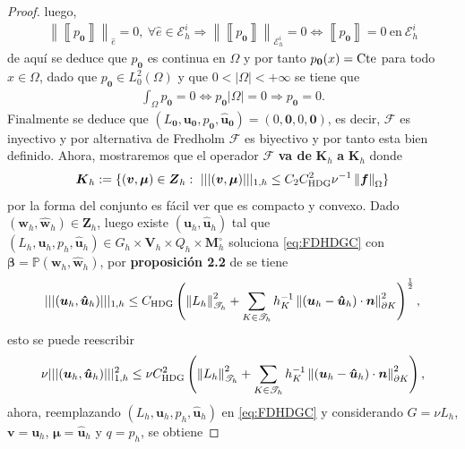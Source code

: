 \documentclass[10pt,a4paper]{report}
\newcommand{\bs}{\boldsymbol}
\newcommand{\Th}{\mathscr{T}_{h}}
\providecommand{\norm}[1]{\left\lVert#1\right\rVert}
\providecommand{\salto}[1]{\left\llbracket#1\right\rrbracket}
\begin{document}
\begin{proof}
    luego,
    \begin{align*}
    	\norm{\salto{p_{\bs{0}}}}_{\hat{e}} = 0,\ \forall \hat{e}\in \mathscr{E}^{i}_{h} \Longrightarrow \norm{\salto{p_{\bs{0}}}}_{\mathscr{E}^{i}_{h}} = 0 \iff \salto{p_{\bs{0}}} = 0\  \text{en}\ \mathscr{E}^{i}_{h}
    \end{align*}
    de aquí se deduce que $p_{\bs{0}}$ es continua en $\Omega$ y por tanto $p_{\bs{0}}(x) = \textup{Cte}$ para todo $x\in \Omega$, dado que $p_{\bs{0}}\in L^{2}_{0}(\Omega)$ y que $0<|\Omega|<+\infty$ se tiene que
    \begin{align*}
    	\int_{\Omega}p_{\bs{0}} = 0 \iff p_{\bs{0}}|\Omega| = 0 \Longrightarrow p_{\bs{0}} = 0.
    \end{align*}
    Finalmente se deduce que $(L_{\bs{0}},\bs{u}_{\bs{0}},p_{\bs{0}},\bs{\hat{u}}_{\bs{0}}) = (0,\bs{0},0,\bs{0})$, es decir, $\mathcal{F}$ es inyectivo y por alternativa de Fredholm $\mathcal{F}$ es biyectivo y por tanto esta bien definido. Ahora, mostraremos que el operador $\bs{\mathcal{F}}$ \textbf{va de} $\bs{K}_{h}$ \textbf{a} $\bs{K}_{h}$ donde 
    \begin{align*}
    	\bs{K}_{h} := \{(\bs{v},\bs{\mu})\in \bs{Z}_{h}:\ |||(\bs{v},\bs{\mu})|||_{1,h}\leq C_{2}C^{2}_{\textup{HDG}} \nu^{-1}\norm{\bs{f}}_{\Omega} \}
    \end{align*}
    por la forma del conjunto es fácil ver que es compacto y convexo. Dado $(\bs{w}_{h},\hat{\bs{w}}_{h})\in \bs{Z}_{h}$, luego existe $(\bs{u}_{h},\hat{\bs{u}}_{h})$ tal que $(L_{h},\bs{u}_{h},p_{h},\bs{\hat{u}}_{h})\in G_{h}\times\bs{V}_{h}\times Q_{h}\times \bs{M}^{\circ}_{h}$ soluciona \ref{eq:FDHDGC} con $\bs{\beta} = \mathbb{P}(\bs{w}_{h},\hat{\bs{w}}_{h})$, por \textbf{proposición 2.2} de \cite{CAC2017} se tiene 
    \begin{align*}
    	|||(\bs{u}_{h},\bs{\hat{u}}_{h})|||_{1,h} \leq C_{\textup{HDG}} \left(\norm{L_{h}}^{2}_{\Th} + \sum_{K\in\Th} h^{-1}_{K}\norm{(\bs{u}_{h} - \bs{\hat{u}}_{h})\cdot \bs{n}}^{2}_{\partial K} \right)^{\frac{1}{2}},
    \end{align*} 
    esto se puede reescribir
    \begin{align*}
    	\nu|||(\bs{u}_{h},\bs{\hat{u}}_{h})|||^{2}_{1,h} \leq \nu C^{2}_{\textup{HDG}} \left(\norm{L_{h}}^{2}_{\Th} + \sum_{K\in\Th} h^{-1}_{K}\norm{(\bs{u}_{h} - \bs{\hat{u}}_{h})\cdot \bs{n}}^{2}_{\partial K} \right),
    \end{align*} 
    ahora, reemplazando $(L_{h},\bs{u}_{h},p_{h},\bs{\hat{u}}_{h})$ en \ref{eq:FDHDGC} y considerando $G = \nu L_{h}$, $\bs{v} = \bs{u}_{h}$, $\bs{\mu} = \bs{\hat{u}}_{h}$ y $q = p_{h}$, se obtiene 

\end{proof}
\end{document}
